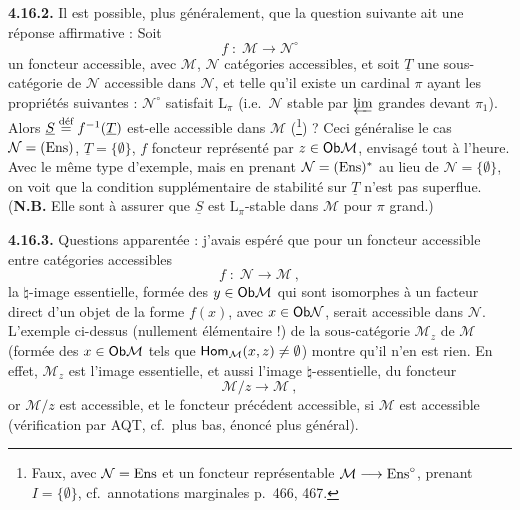 \textbf{4.16.2.} Il est possible, plus généralement, que la question suivante ait une réponse affirmative : Soit
\[
f \;:\; \mathcal{M} \longrightarrow \mathcal{N}^\circ
\]
un foncteur accessible, avec $\mathcal{M}$, $\mathcal{N}$ catégories accessibles, et soit $\underline{T}$ une sous-catégorie de $\mathcal{N}$ accessible dans $\mathcal{N}$, et telle qu'il existe un cardinal $\pi$ ayant les propriétés suivantes : $\mathcal{N}^\circ$ satisfait $\mathrm{L}_\pi$ (i.e.\ $\mathcal{N}$ stable par $\varprojlim$ grandes devant $\pi_1$). Alors $\underline{S} \defeq f^{-1}(\underline{T})$ est-elle accessible dans $\mathcal{M}$ (\footnote[191]{Faux, avec $\mathcal{N} = \Ens$ et un foncteur représentable $\mathcal{M} \longrightarrow \Ens^\circ$, prenant $I = \{\emptyset\}$, cf.\ annotations marginales p.~466, 467.}) ? Ceci généralise le cas $\mathcal{N} = (\Ens)$, $\underline{T} = \{\emptyset\}$, $f$ foncteur représenté par $z \in \Ob\mathcal{M}$, envisagé tout à l'heure. Avec le même type d'exemple, mais en prenant $\mathcal{N} = (\Ens)^*$
au lieu de $\mathcal{N} = \{\emptyset\}$, on voit que la condition supplémentaire de stabilité sur $\underline{T}$ n'est pas
superflue. (\textbf{N.B.} Elle sont à assurer que $\underline{S}$ est $\mathrm{L}_\pi$-stable dans $\mathcal{M}$ pour $\pi$ grand.) %

\textbf{4.16.3.} Questions apparentée : j'avais espéré que pour un foncteur accessible entre catégories accessibles %
\[
f \;:\; \mathcal{N} \longrightarrow \mathcal{M}\ ,
\]
la $\natural$-image essentielle, formée des $y \in \Ob\mathcal{M}$ qui sont isomorphes à un facteur direct d'un objet de la forme $f(x)$, avec $x \in \Ob\mathcal{N}$, serait accessible dans $\mathcal{N}$. L'exemple ci-dessus (nullement élémentaire !) de la sous-catégorie $\mathcal{M}_z$ de $\mathcal{M}$ (formée des $x \in \Ob\mathcal{M}$ tels que $\Hom_{\mathcal{M}}(x,z) \neq \emptyset$) montre qu'il n'en est rien. En effet, $\mathcal{M}_z$ est l'image essentielle, et aussi l'image $\natural$-essentielle, du foncteur
\[
\mathcal{M}/z \longrightarrow \mathcal{M}\ ,
\]
or $\mathcal{M}/z$ est accessible, et le foncteur précédent accessible, si $\mathcal{M}$ est accessible (vérification par AQT, cf.\ plus bas, énoncé plus général).


